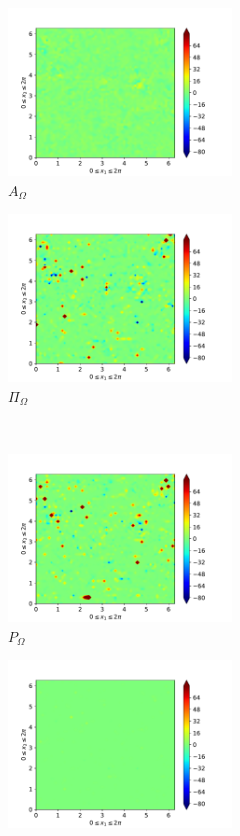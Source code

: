 \begin{figure}[H]
\begin{subfigure}{0.45\textwidth}
        \includegraphics[height=1.75in]{media/run-cds-65/A-enst-1400}
        \caption{$A_{\Omega}$}
    \end{subfigure}
    \newline
    \begin{subfigure}{0.45\textwidth}
        \includegraphics[height=1.75in]{media/run-cds-65/Pi-enst-1400}
        \caption{$\Pi_{\Omega}$}
    \end{subfigure}
    ~
    \begin{subfigure}{0.45\textwidth}
        \includegraphics[height=1.75in]{media/run-cds-65/P-enst-1400}
        \caption{$P_{\Omega}$}
    \end{subfigure}
    \newline
    \begin{subfigure}{0.45\textwidth}
        \includegraphics[height=1.75in]{media/run-cds-65/B-enst-1400}

\end{subfigure}
\end{figure}
